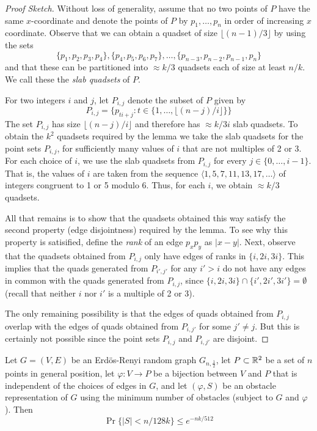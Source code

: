 \documentclass{patmorin}
\begin{document}
\begin{proof}[Proof Sketch]
  Without loss of generality, assume that no two points of $P$ have the
  same $x$-coordinate and denote the points of $P$ by $p_1,\ldots,p_n$
  in order of increasing $x$ coordinate.  Observe that we can obtain a
  quadset of size $\lfloor (n-1)/3\rfloor$ by using the sets
  \[
     \{p_1,p_2,p_3,p_4\}, \{p_4,p_5,p_6,p_7\},
        \ldots,\{p_{n-3},p_{n-2},p_{n-1},p_{n}\}
  \]
  and that these can be partitioned into $\approx k/3$ quadsets each of size at
  least $n/k$.  We call these the \emph{slab quadsets} of $P$.

  For two integers $i$ and $j$, let $P_{i,j}$ denote the subset of $P$
  given by
  \[
    P_{i,j} = \{ p_{ti+j} : t\in \{1,\ldots,\lfloor(n-j)/i\rfloor\} \}
  \]
  The set $P_{i,j}$ has size $\lfloor(n-j)/i\rfloor$ and therefore has
  $\approx k/3i$ slab quadsets.  To obtain the $k^2$ quadsets required
  by the lemma we take the slab quadsets for the point sets $P_{i,j}$,
  for sufficiently many values of $i$ that are not multiples of 2
  or 3.  For each choice of $i$, we use the slab quadsets from $P_{i,j}$
  for every $j\in\{0,\ldots,i-1\}$.  That is, the values of $i$
  are taken from the sequence $\langle 1,5,7,11,13,17,\ldots\rangle$
  of integers congruent to 1 or 5 modulo 6.  Thus, for each $i$, we obtain
  $\approx k/3$ quadsets.

  All that remains is to show that the quadsets obtained this way satisfy
  the second property (edge disjointness) required by the lemma.  To see
  why this property is satisified, define the \emph{rank} of an edge
  $p_xp_y$ as $|x-y|$.  Next, observe that the quadsets obtained from
  $P_{i,j}$ only have edges of ranks in $\{i,2i,3i\}$.  This implies
  that the quads generated from $P_{i',j'}$ for any $i'>i$ do not have
  any edges in common with the quads generated from $P_{i,j}$, since
  $\{i,2i,3i\}\cap\{i',2i',3i'\}=\emptyset$ (recall that neither $i$
  nor $i'$ is a multiple of 2 or 3).

  The only remaining possibility is that the edges of quads obtained
  from $P_{i,j}$ overlap with the edges of quads obtained from $P_{i,j'}$
  for some $j'\neq j$.  But this is certainly not possible since the point
  sets $P_{i,j}$ and $P_{i,j'}$ are disjoint.
\end{proof}

\begin{lem}
  Let $G=(V,E)$ be an Erd\"os-Renyi random graph $G_{n,\frac{1}{2}}$,
  let $P\subset\mathbb{R}^2$ be a set of $n$ points in general position, let
  $\varphi:V\rightarrow P$ be a bijection between $V$ and $P$ that is
  independent of the choices of edges in $G$, and let $(\varphi, S)$ be
  an obstacle representation of $G$ using the minimum number of obstacles
  (subject to $G$ and $\varphi$).  Then
  \[
     \Pr\{|S| < n/128k\} \le e^{-nk/512}
  \]
\end{lem}
\end{document}

